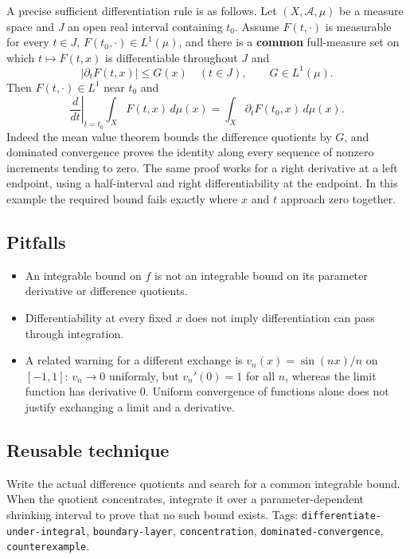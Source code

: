 \documentclass[
  11pt,
]{article}
\providecommand{\tightlist}{%
  \setlength{\itemsep}{0pt}\setlength{\parskip}{0pt}}
\begin{document}
A precise sufficient differentiation rule is as follows. Let
\((X,\mathcal A,\mu)\) be a measure space and \(J\) an open real
interval containing \(t_0\). Assume \(F(t,\cdot)\) is measurable for
every \(t\in J\), \(F(t_0,\cdot)\in L^1(\mu)\), and there is a
\textbf{common} full-measure set on which \(t\mapsto F(t,x)\) is
differentiable throughout \(J\) and \[
|\partial_tF(t,x)|\le G(x)\quad(t\in J),\qquad G\in L^1(\mu).
\] Then \(F(t,\cdot)\in L^1\) near \(t_0\) and \[
\left.\frac{d}{dt}\right|_{t=t_0}\int_XF(t,x)\,d\mu(x)
=\int_X\partial_tF(t_0,x)\,d\mu(x).
\] Indeed the mean value theorem bounds the difference quotients by
\(G\), and dominated convergence proves the identity along every
sequence of nonzero increments tending to zero. The same proof works for
a right derivative at a left endpoint, using a half-interval and right
differentiability at the endpoint. In this example the required bound
fails exactly where \(x\) and \(t\) approach zero together.

\subsection{Pitfalls}\label{pitfalls-14}

\begin{itemize}
\tightlist
\item
  An integrable bound on \(f\) is not an integrable bound on its
  parameter derivative or difference quotients.
\item
  Differentiability at every fixed \(x\) does not imply differentiation
  can pass through integration.
\item
  A related warning for a different exchange is \(v_n(x)=\sin(nx)/n\) on
  \([-1,1]\): \(v_n\to0\) uniformly, but \(v_n'(0)=1\) for all \(n\),
  whereas the limit function has derivative \(0\). Uniform convergence
  of functions alone does not justify exchanging a limit and a
  derivative.
\end{itemize}

\subsection{Reusable technique}\label{reusable-technique-14}

Write the actual difference quotients and search for a common integrable
bound. When the quotient concentrates, integrate it over a
parameter-dependent shrinking interval to prove that no such bound
exists. Tags: \texttt{differentiate-\allowbreak{}under-\allowbreak{}integral},
\texttt{boundary-\allowbreak{}layer}, \texttt{concentration},
\texttt{dominated-\allowbreak{}convergence}, \texttt{counterexample}.
\end{document}
